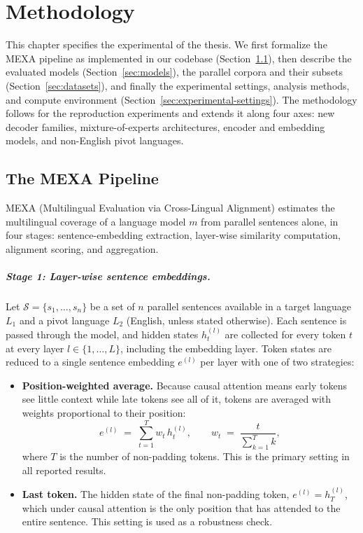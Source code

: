 \chapter{Methodology}
\label{ch:methodology}

This chapter specifies the experimental  of the thesis. We first
formalize the MEXA pipeline as implemented in our codebase
(Section~\ref{sec:mexa-pipeline}), then describe the evaluated models
(Section~\ref{sec:models}), the parallel corpora and their subsets
(Section~\ref{sec:datasets}), and finally the experimental settings,
analysis methods, and compute environment
(Section~\ref{sec:experimental-settings}). The methodology follows
\citet{kargaran2025mexa} for the reproduction experiments and extends it
along four axes: new decoder families, mixture-of-experts architectures,
encoder and embedding models, and non-English pivot languages.

\section{The MEXA Pipeline}
\label{sec:mexa-pipeline}

MEXA (Multilingual Evaluation via Cross-Lingual Alignment) estimates the
multilingual coverage of a language model $m$ from parallel sentences
alone, in four stages: sentence-embedding extraction, layer-wise
similarity computation, alignment scoring, and aggregation.

\paragraph{Stage 1: Layer-wise sentence embeddings.}
Let $\mathcal{S} = \{s_1, \dots, s_n\}$ be a set of $n$ parallel sentences
available in a target language $L_1$ and a pivot language $L_2$ (English,
unless stated otherwise). Each sentence is passed through the model, and
hidden states $h_t^{(l)}$ are collected for every token $t$ at every layer
$l \in \{1, \dots, L\}$, including the embedding layer. Token states are
reduced to a single sentence embedding $e^{(l)}$ per layer with one of two
strategies:

\begin{itemize}
    \item \textbf{Position-weighted average.} Because causal attention
    means early tokens see little context while late tokens see all of it,
    tokens are averaged with weights proportional to their position:
    \begin{equation}
        e^{(l)} \;=\; \sum_{t=1}^{T} w_t\, h_t^{(l)},
        \qquad
        w_t \;=\; \frac{t}{\sum_{k=1}^{T} k},
        \label{eq:weighted-avg}
    \end{equation}
    where $T$ is the number of non-padding tokens. This is the primary
    setting in all reported results.
    \item \textbf{Last token.} The hidden state of the final non-padding
    token, $e^{(l)} = h_T^{(l)}$, which under causal attention is the only
    position that has attended to the entire sentence. This setting is
    used as a robustness check.
\end{itemize}

